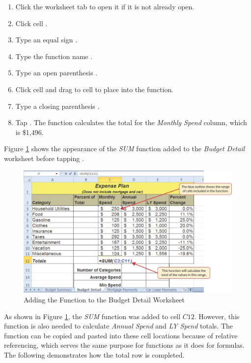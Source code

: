 \begin{enumbox}
	\begin{enumerate}
		\item Click the  worksheet tab to open it if it is not already open.
		\item Click cell .
		\item Type an equal sign \fmtTyping{=}.
		\item Type the function name .
		\item Type an open parenthesis \fmtTyping{(}.
		\item Click cell  and drag to cell  to place  into the function.
		\item Type a closing parenthesis \fmtTyping{)}.
		\item Tap . The function calculates the total for the \textit{Monthly Spend} column, which is \$1,496.
	\end{enumerate}
\end{enumbox}

Figure \ref{02:fig11} shows the appearance of the \textit{SUM} function added to the \textit{Budget Detail} worksheet before tapping .

\begin{figure}[H]
	\centering
	\includegraphics[width=\maxwidth{.95\linewidth}]{gfx/ch02_fig11}
	\caption{Adding the  Function to the Budget Detail Worksheet}
	\label{02:fig11}
\end{figure}

As shown in Figure \ref{02:fig11}, the \textit{SUM} function was added to cell $ C12 $. However, this function is also needed to calculate \textit{Annual Spend} and \textit{LY Spend} totals. The function can be copied and pasted into these cell locations because of relative referencing, which serves the same purpose for functions as it does for formulas. The following demonstrates how the total row is completed.


